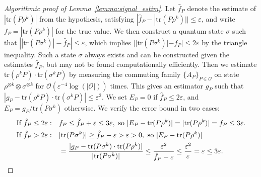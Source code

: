 \documentclass[aps,%
twocolumn,%
floatfix,%
pra,%
amsfonts,%
groupedaddress,%
superscriptaddress]{revtex4-2}%
\newcommand{\1}{\mathbbm{1}}
\begin{document}
\begin{proof}[Algorithmic proof of Lemma~\ref{lemma:signal_estim}]
    \color{red}Let $\hat{f}_P$ denote the estimate of $|\mathrm{tr}(P \rho^k)|$ from the hypothesis, satisfying $|\hat{f}_P - |\mathrm{tr}(P \rho^k)|| \leq \varepsilon$, and write $f_P = |\mathrm{tr}(P \rho^k)|$ for the true value.\color{black} We then construct a quantum state $\sigma$ such that $\left||\mathrm{tr}(P \sigma^k)|- \hat{f}_P\right| \leq \varepsilon$, which implies $||\mathrm{tr}(P\sigma^k)| - f_P| \leq 2\varepsilon$ by the triangle inequality. Such a state $\sigma$ always exists and can be constructed given the estimates $\hat{f}_P$, but may not be found computationally efficiently.
    Then we estimate $\mathrm{tr}(\rho^k P)\cdot \mathrm{tr}(\sigma^k P)$ by measuring the commuting family $\{A_P\}_{P\in \mathcal{O}}$ on state $\rho^{\otimes k} \otimes \sigma^{\otimes k}$ for $\mathcal{O}(\varepsilon^{-4}\log(|\mathcal{O}|))$ times. This gives an estimator $g_P$ such that $|g_P - \mathrm{tr}(\rho^k P)\cdot \mathrm{tr}(\sigma^k P)|\leq \varepsilon^2$.
    \color{red}We set $E_P = 0$ if $\hat{f}_P \leq 2\varepsilon$, and $E_P = g_P/\mathrm{tr}(P \sigma^k)$ otherwise.
    We verify the error bound in two cases:
    \begin{align}
        \text{If~} \hat{f}_P \leq 2\varepsilon:\quad  &f_P \leq \hat{f}_P + \varepsilon \leq 3\varepsilon,\text{~so~} |E_P - \mathrm{tr}(P \rho^k)| = |\mathrm{tr}(P \rho^k)| = f_P \leq 3\varepsilon. \\
        \text{If~} \hat{f}_P > 2\varepsilon:\quad &|\mathrm{tr}(P \sigma^k)| \geq \hat{f}_P - \varepsilon > \varepsilon > 0,\text{~so~} |E_P - \mathrm{tr}(P \rho^k)| \notag\\
            &= \frac{|g_P - \mathrm{tr}(P \sigma^k) \cdot \mathrm{tr}(P \rho^k)|}{|\mathrm{tr}(P \sigma^k)|}
            \leq  \frac{\varepsilon^2}{\hat{f}_P - \varepsilon}  \leq \frac{\varepsilon^2}{\varepsilon} = \varepsilon \leq 3\varepsilon.
    \end{align}\color{black}
\end{proof}
\end{document}

